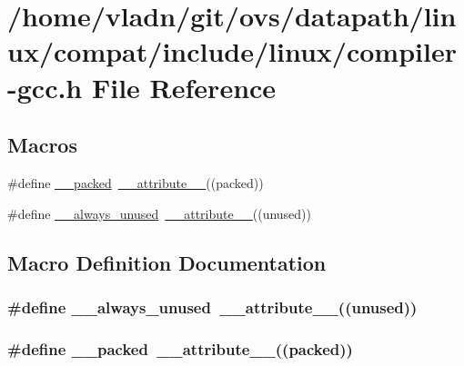 \hypertarget{compiler-gcc_8h}{}\section{/home/vladn/git/ovs/datapath/linux/compat/include/linux/compiler-\/gcc.h File Reference}
\label{compiler-gcc_8h}
\subsection*{Macros}
\begin{DoxyCompactItemize}
\item 
\#define \hyperlink{compiler-gcc_8h_a0fe7dde4488278fd739041b673efa525}{\+\_\+\+\_\+packed}~\hyperlink{vport-vxlan_8mod_8c_aebedc6dfadccd01faf3f462d4fa936f7}{\+\_\+\+\_\+attribute\+\_\+\+\_\+}((packed))
\item 
\#define \hyperlink{compiler-gcc_8h_a4df9005d46835d584f7e924597114061}{\+\_\+\+\_\+always\+\_\+unused}~\hyperlink{vport-vxlan_8mod_8c_aebedc6dfadccd01faf3f462d4fa936f7}{\+\_\+\+\_\+attribute\+\_\+\+\_\+}((unused))
\end{DoxyCompactItemize}


\subsection{Macro Definition Documentation}
\hypertarget{compiler-gcc_8h_a4df9005d46835d584f7e924597114061}{}
\subsubsection[{\+\_\+\+\_\+always\+\_\+unused}]{\setlength{\rightskip}{0pt plus 5cm}\#define \+\_\+\+\_\+always\+\_\+unused~{\bf \+\_\+\+\_\+attribute\+\_\+\+\_\+}((unused))}\label{compiler-gcc_8h_a4df9005d46835d584f7e924597114061}
\hypertarget{compiler-gcc_8h_a0fe7dde4488278fd739041b673efa525}{}
\subsubsection[{\+\_\+\+\_\+packed}]{\setlength{\rightskip}{0pt plus 5cm}\#define \+\_\+\+\_\+packed~{\bf \+\_\+\+\_\+attribute\+\_\+\+\_\+}((packed))}\label{compiler-gcc_8h_a0fe7dde4488278fd739041b673efa525}
